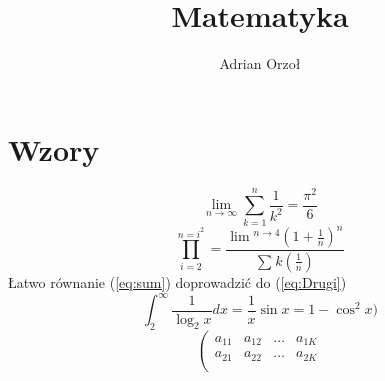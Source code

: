 \documentclass[a4paper,12pt]{article}
\title{Matematyka}
\author{Adrian Orzoł}
\begin{document}
\maketitle

\section{Wzory}
\begin{equation}\label{eq:Pierwszy}\lim_{n \to \infty}\sum_{k=1}^n \frac{1}{k^2}=\frac{\pi^2}{6}\end{equation}
\begin{equation}\label{eq:Drugi}\prod_{i=2}^{n=i^2}=\frac{\lim_{}{}^{n \to 4}(1+\frac{1}{n})^n}{\sum_{}{}k(\frac{1}{n})}\end{equation}
Łatwo równanie (\ref{eq:sum}) doprowadzić do (\ref{eq:Drugi})
\begin{equation}\label{eq:Trzeci}\int_{2}^\infty \frac{1}{\log_{2}x}dx=\frac{1}{x}\sin x=1-\cos^2 x)\end{equation}
\begin{equation}\label{eq:Czwarty}\left(\begin{array}{cccc}a_{11}&a_{12}&\ldots&a_{1K}\\a_{21}&a_{22}&\ldots&a_{2K}\\\end{array}\end{equation}
\end{document}

